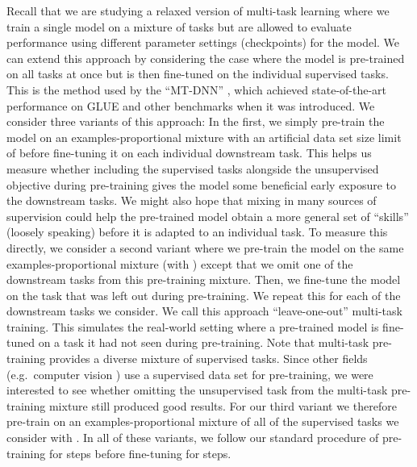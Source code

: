 \documentclass[twoside,11pt]{article}
\begin{document}
Recall that we are studying a relaxed version of multi-task learning where we train a single model on a mixture of tasks but are allowed to evaluate performance using different parameter settings (checkpoints) for the model.
We can extend this approach by considering the case where the model is pre-trained on all tasks at once but is then fine-tuned on the individual supervised tasks.
This is the method used by the ``MT-DNN'' \citep{liu2015representation,liu2019multi}, which achieved state-of-the-art performance on GLUE and other benchmarks when it was introduced.
We consider three variants of this approach:
In the first, we simply pre-train the model on an examples-proportional mixture with an artificial data set size limit of  before fine-tuning it on each individual downstream task.
This helps us measure whether including the supervised tasks alongside the unsupervised objective during pre-training gives the model some beneficial early exposure to the downstream tasks.
We might also hope that mixing in many sources of supervision could help the pre-trained model obtain a more general set of ``skills'' (loosely speaking) before it is adapted to an individual task.
To measure this directly, we consider a second variant where we pre-train the model on the same examples-proportional mixture (with ) except that we omit one of the downstream tasks from this pre-training mixture.
Then, we fine-tune the model on the task that was left out during pre-training.
We repeat this for each of the downstream tasks we consider.
We call this approach ``leave-one-out'' multi-task training.
This simulates the real-world setting where a pre-trained model is fine-tuned on a task it had not seen during pre-training.
Note that multi-task pre-training provides a diverse mixture of supervised tasks.
Since other fields (e.g.\ computer vision \citep{oquab2014learning,jia2014caffe,huh2016makes,yosinski2014transferable}) use a supervised data set for pre-training, we were interested to see whether omitting the unsupervised task from the multi-task pre-training mixture still produced good results.
For our third variant we therefore pre-train on an examples-proportional mixture of all of the supervised tasks we consider with .
In all of these variants, we follow our standard procedure of pre-training for  steps before fine-tuning for  steps.
\end{document}
